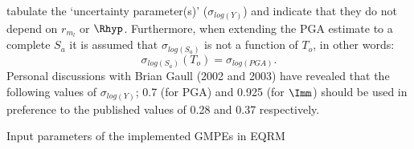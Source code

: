 \citet[Table 4]{eqrm_Gaull90a} tabulate the `uncertainty
parameter(s)' ($\sigma_{log(Y)}$) and indicate that they do not
depend on $r_{m_l}$ or $\Rhyp$. Furthermore, when extending the PGA
estimate to a complete $S_a$ it is assumed that $\sigma_{log(S_a)}$
is not a function of $T_o$, in other words:
\begin{equation}
\sigma_{log(S_a)}(T_o) = \sigma_{log(PGA)}.
\end{equation}
Personal discussions with Brian Gaull (2002 and 2003) have revealed
that the following values of $\sigma_{log(Y)}$; 0.7 (for PGA) and
0.925 (for $\Imm$) should be used in preference to the published
values of 0.28 and 0.37 respectively.
\begin{landscape}
\begin{table}[!t]
\renewcommand{\arraystretch}{1.3}
\caption{Input parameters of the implemented GMPEs in EQRM}
\label{inputs} \centering


\end{table}
\end{landscape}
